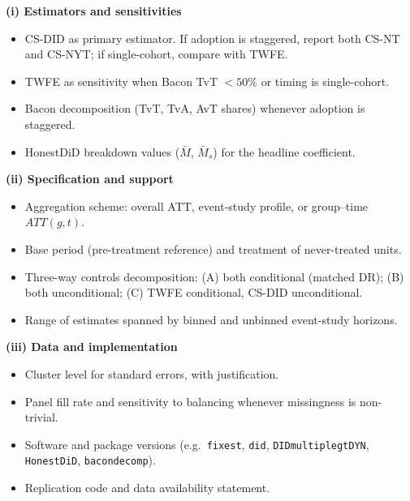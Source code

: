 \documentclass[11pt]{article}
\begin{document}
\begin{landscape}
\begin{tcolorbox}[
  colback=gray!5,
  colframe=black!70,
  arc=1mm,
  boxrule=0.5pt,
  left=6pt,right=6pt,top=4pt,bottom=4pt,
]
{\noindent\begin{minipage}[t]{0.325\linewidth}
\textbf{(i) Estimators and sensitivities}
\begin{itemize}[leftmargin=1.2em, itemsep=1pt, topsep=2pt]
  \item CS-DID as primary estimator. If adoption is staggered, report both CS-NT and CS-NYT; if single-cohort, compare with TWFE.
  \item TWFE as sensitivity when Bacon TvT $< 50\%$ or timing is single-cohort.
  \item Bacon decomposition (TvT, TvA, AvT shares) whenever adoption is staggered.
  \item HonestDiD breakdown values ($\bar{M}$, $\bar{M}_s$) for the headline coefficient.
\end{itemize}
\end{minipage}\hfill
\begin{minipage}[t]{0.325\linewidth}
\textbf{(ii) Specification and support}
\begin{itemize}[leftmargin=1.2em, itemsep=1pt, topsep=2pt]
  \item Aggregation scheme: overall ATT, event-study profile, or group--time $ATT(g,t)$.
  \item Base period (pre-treatment reference) and treatment of never-treated units.
  \item Three-way controls decomposition: (A) both conditional (matched DR); (B) both unconditional; (C) TWFE conditional, CS-DID unconditional.
  \item Range of estimates spanned by binned and unbinned event-study horizons.
\end{itemize}
\end{minipage}\hfill
\begin{minipage}[t]{0.325\linewidth}
\textbf{(iii) Data and implementation}
\begin{itemize}[leftmargin=1.2em, itemsep=1pt, topsep=2pt]
  \item Cluster level for standard errors, with justification.
  \item Panel fill rate and sensitivity to balancing whenever missingness is non-trivial.
  \item Software and package versions (e.g.\ \texttt{fixest}, \texttt{did}, \texttt{DIDmultiplegtDYN}, \texttt{HonestDiD}, \texttt{bacondecomp}).
  \item Replication code and data availability statement.
\end{itemize}
\end{minipage}
}
\end{tcolorbox}


\end{landscape}
\end{document}
